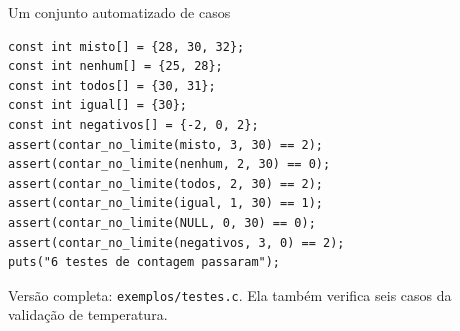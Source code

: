 \begin{frame}[fragile]{Um conjunto automatizado de casos}
\begin{lstlisting}
const int misto[] = {28, 30, 32};
const int nenhum[] = {25, 28};
const int todos[] = {30, 31};
const int igual[] = {30};
const int negativos[] = {-2, 0, 2};
assert(contar_no_limite(misto, 3, 30) == 2);
assert(contar_no_limite(nenhum, 2, 30) == 0);
assert(contar_no_limite(todos, 2, 30) == 2);
assert(contar_no_limite(igual, 1, 30) == 1);
assert(contar_no_limite(NULL, 0, 30) == 0);
assert(contar_no_limite(negativos, 3, 0) == 2);
puts("6 testes de contagem passaram");
\end{lstlisting}
\small Versão completa: \texttt{exemplos/testes.c}. Ela também verifica seis casos da validação de temperatura.
\end{frame}
